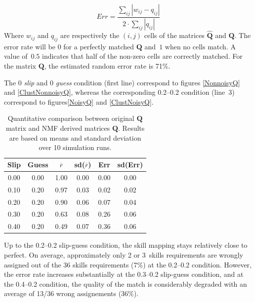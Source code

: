 \begin{equation}
  Err = \frac{\sum_{ij} |w_{ij} - q_{ij}| }{2 \cdot \sum_{ij} |q_{ij}| }
\end{equation}
Where $w_{ij}$ and $q_{ij}$ are respectively the $(i,j)$ cells of the matrices $\hat{\mathbf{Q}}$ and $\mathbf{Q}$.  The error rate will be $0$ for a perfectly matched $\mathbf{Q}$ and~$1$ when no cells match.  A value of~$0.5$ indicates that half of the non-zero cells are correctly matched. For the matrix $\mathbf{Q}$, the estimated random error rate is 71\%.

The 0 \textit{slip} and 0 \textit{guess} condition (first line) correspond to figures \ref{NonnoisyQ} and \ref{ClustNonnoisyQ}, whereas the corresponding 0.2--0.2 condition (line~3) correspond to figures\ref{NoisyQ}  and \ref{ClustNoisyQ}.



\newcommand{\ha}[2]{\multicolumn{#1}{c}{\textbf{#2}}}
\newcommand{\hb}[1]{\ha{1}{#1}}
\begin{table}
  \caption{Quantitative comparison between original $\mathbf{Q}$ matrix and NMF derived matrices $\hat{\mathbf{Q}}$.  Results are based on means and standard deviation over 10 simulation runs.}
  \begin{center}
  \begin{tabular}{cccccc}
    \hline
 \hb{Slip} & \hb{Guess} & \hb{$\overline{r}$} & \hb{sd($\overline{r}$)} & \hb{Err} & \hb{sd(Err)} \\ 
  \hline
0.00 & 0.00 & 1.00 & 0.00 & 0.00 & 0.00 \\ 
0.10 & 0.20 & 0.97 & 0.03 & 0.02 & 0.02 \\ 
0.20 & 0.20 & 0.90 & 0.06 & 0.07 & 0.04 \\ 
0.30 & 0.20 & 0.63 & 0.08 & 0.26 & 0.06 \\ 
0.40 & 0.20 & 0.49 & 0.07 & 0.36 & 0.06 \\ 
  \hline
  \end{tabular}
  \end{center}

\label{tab:wq-comp}
\end{table}

Up to the 0.2--0.2 slip-guess condition, the skill mapping stays relatively close to perfect. On average, approximately only 2 or 3~skills requirements are wrongly assigned out of the 36 skills requirements (7\%) at the 0.2--0.2 condition.  However, the error rate increases substantially at the 0.3--0.2 slip-guess condition, and at the 0.4--0.2 condition, the quality of the match is considerably degraded with an average of 13/36 wrong assignements (36\%).


